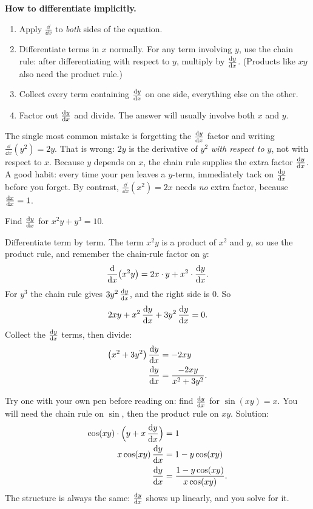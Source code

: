 \begin{focusbox}
\textbf{How to differentiate implicitly.}
\begin{enumerate}
\item Apply $\frac{\dd}{\dd x}$ to \emph{both} sides of the equation.
\item Differentiate terms in $x$ normally. For any term involving $y$, use the chain rule: after
differentiating with respect to $y$, multiply by $\frac{\mathrm{d} y}{\mathrm{d} x}$. (Products like $xy$ also need the
product rule.)
\item Collect every term containing $\frac{\mathrm{d} y}{\mathrm{d} x}$ on one side, everything else on the other.
\item Factor out $\frac{\mathrm{d} y}{\mathrm{d} x}$ and divide. The answer will usually involve both $x$ and $y$.
\end{enumerate}
\end{focusbox}

\begin{trapbox}
The single most common mistake is forgetting the $\frac{\mathrm{d} y}{\mathrm{d} x}$ factor and writing
$\frac{\dd}{\dd x}(y^2) = 2y$. That is wrong: $2y$ is the derivative of $y^2$ \emph{with respect to
$y$}, not with respect to $x$. Because $y$ depends on $x$, the chain rule supplies
the extra factor $\frac{\mathrm{d} y}{\mathrm{d} x}$. A good habit: every time your pen leaves a $y$-term, immediately tack
on $\frac{\mathrm{d} y}{\mathrm{d} x}$ before you forget. By contrast, $\frac{\dd}{\dd x}(x^2)=2x$ needs \emph{no} extra
factor, because $\frac{\mathrm{d} x}{\mathrm{d} x}=1$.
\end{trapbox}

\begin{example}
\label{ch13:ex-product}
Find $\frac{\mathrm{d} y}{\mathrm{d} x}$ for $x^2 y + y^3 = 10$.

Differentiate term by term. The term $x^2 y$ is a product of $x^2$ and $y$, so use the product rule,
and remember the chain-rule factor on $y$:
\[
\frac{\mathrm{d}}{\mathrm{d} x}\!\left(x^2 y\right) = 2x\cdot y + x^2\cdot \frac{\mathrm{d} y}{\mathrm{d} x}.
\]
For $y^3$ the chain rule gives $3y^2\,\frac{\mathrm{d} y}{\mathrm{d} x}$, and the right side is $0$. So
\[
2xy + x^2\,\frac{\mathrm{d} y}{\mathrm{d} x} + 3y^2\,\frac{\mathrm{d} y}{\mathrm{d} x} = 0.
\]
Collect the $\frac{\mathrm{d} y}{\mathrm{d} x}$ terms, then divide:
\begin{align*}
\left(x^2 + 3y^2\right)\frac{\mathrm{d} y}{\mathrm{d} x} &= -2xy \\
\frac{\mathrm{d} y}{\mathrm{d} x} &= \frac{-2xy}{x^2 + 3y^2}.
\end{align*}
\end{example}

\begin{labbox}
Try one with your own pen before reading on: find $\frac{\mathrm{d} y}{\mathrm{d} x}$ for $\sin(xy) = x$. You will need the
chain rule on $\sin$, then the product rule on $xy$. Solution:
\begin{align*}
\cos(xy)\cdot\Bigl(y + x\,\frac{\mathrm{d} y}{\mathrm{d} x}\Bigr) &= 1 \\
x\cos(xy)\,\frac{\mathrm{d} y}{\mathrm{d} x} &= 1 - y\cos(xy) \\
\frac{\mathrm{d} y}{\mathrm{d} x} &= \frac{1 - y\cos(xy)}{x\cos(xy)}.
\end{align*}
The structure is always the same: $\frac{\mathrm{d} y}{\mathrm{d} x}$ shows up linearly, and you solve for it.
\end{labbox}


